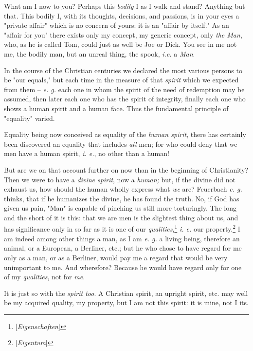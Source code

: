 \documentclass[a4paper]{book}
\begin{document}
What am I now to you? Perhaps this \textit{bodily} I as I walk and stand? 
Anything but that. This bodily I, with its thoughts, decisions, and passions, 
is in your eyes a "{}private affair"{} which is no concern of yours: it is an 
"{}affair by itself."{} As an "{}affair for you"{} there exists only my 
concept, my generic concept, only \textit{the Man}, who, as he is called Tom, 
could just as well be Joe or Dick. You see in me not me, the bodily man, but 
an unreal thing, the spook, \textit{i.e.} a \textit{Man}.

In the course of the Christian centuries we declared the most various persons 
to be "{}our equals,"{} but each time in the measure of that \textit{spirit} 
which we expected from them -- \textit{e. g.} each one in whom the spirit of 
the need of redemption may be assumed, then later each one who has the spirit 
of integrity, finally each one who shows a human spirit and a human face. Thus 
the fundamental principle of "{}equality"{} varied.

 Equality being now conceived as equality of the \textit{human spirit}, there 
has certainly been discovered an equality that includes \textit{all} men; for 
who could deny that we men have a human spirit, \textit{i. e.}, no other than 
a human!

But are we on that account further on now than in the beginning of 
Christianity? Then we were to have a \textit{divine spirit}, now a 
\textit{human;} but, if the divine did not exhaust us, how should the human 
wholly express what \textit{we} are? Feuerbach \textit{e. g.} thinks, that if 
he humanizes the divine, he has found the truth. No, if God has given us pain, 
"{}Man"{} is capable of pinching us still more torturingly. The long and the 
short of it is this: that we are men is the slightest thing about us, and has 
significance only in so far as it is one of our 
\textit{qualities},\footnote{[\textit{Eigenschaften}]} \textit{i. e.} our 
property.\footnote{[\textit{Eigentum}]} I am indeed among other things a man, 
as I am \textit{e. g.} a living being, therefore an animal, or a European, a 
Berliner, etc.; but he who chose to have regard for me only as a man, or as a 
Berliner, would pay me a regard that would be very unimportant to me. And 
wherefore? Because he would have regard only for one of my \textit{qualities}, 
not for \textit{me}.

It is just so with the \textit{spirit too}. A Christian spirit, an upright 
spirit, etc. may well be my acquired quality, my property, but I am not this 
spirit: it is mine, not I its.
\end{document}
